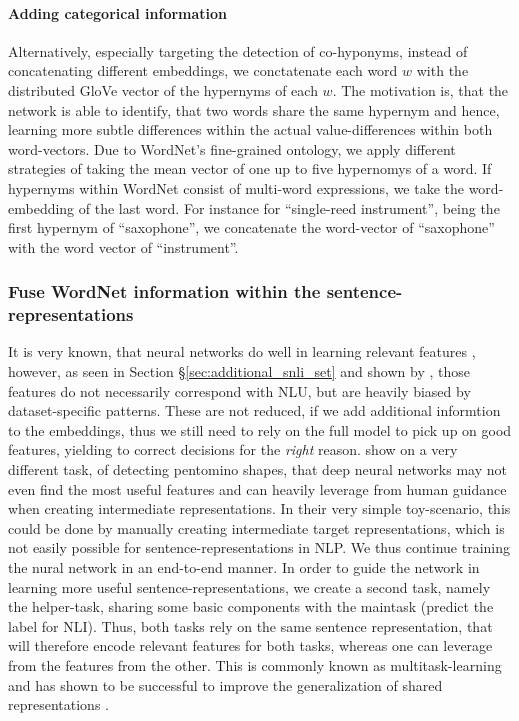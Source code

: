 \paragraph*{Adding categorical information}
Alternatively, especially targeting the detection of co-hyponyms, instead of concatenating different embeddings, we conctatenate each word $w$ with the distributed GloVe vector of the hypernyms of each $w$. The motivation is, that the network is able to identify, that two words share the same hypernym and hence, learning more subtle differences within the actual value-differences within both word-vectors. Due to WordNet's fine-grained ontology, we apply different strategies of taking the mean vector of one up to five hypernomys of a word. If hypernyms within WordNet consist of multi-word expressions, we take the word-embedding of the last word. For instance for ``single-reed instrument'', being the first hypernym of ``saxophone'', we concatenate the word-vector of ``saxophone'' with the word vector of ``instrument''.
\subsubsection{Fuse WordNet information within the sentence-representations}
It is very known, that neural networks do well in learning relevant features \citep{bengio2013representation}, however, as seen in Section §\ref{sec:additional_snli_set} and shown by \cite{gururangan2018annotation}, those features do not necessarily correspond with \ac{NLU}, but are heavily biased by dataset-specific patterns. These are not reduced, if we add additional informtion to the embeddings, thus we still need to rely on the full model to pick up on good features, yielding to correct decisions for the \textit{right} reason. \cite{gulccehre2016knowledge} show on a very different task, of detecting pentomino shapes, that deep neural networks may not even find the most useful features and can heavily leverage from human guidance when creating intermediate representations. In their very simple toy-scenario, this could be done by manually creating intermediate target representations, which is not easily possible for sentence-representations in \ac{NLP}. We thus continue training the nural network in an end-to-end manner. In order to guide the network in learning more useful sentence-representations, we create a second task, namely the helper-task, sharing some basic components with the maintask (predict the label for \ac{NLI}). Thus, both tasks rely on the same sentence representation, that will therefore encode relevant features for both tasks, whereas one can leverage from the features from the other. This is commonly known as multitask-learning and has shown to be successful to improve the generalization of shared representations \citep{nangia2017repeval}.
